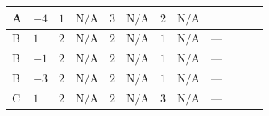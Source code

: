 \documentclass[8pt]{article}
\begin{document}
\begin{landscape}
\begin{longtable}{@{}llcccccc >{\raggedright\arraybackslash}p{0.21\linewidth} >{\raggedright\arraybackslash}p{0.21\linewidth} >{\raggedright\arraybackslash}p{0.21\linewidth}@{}}
\midrule
A & $-4$ & $1$ & $\text{N/A}$ & $3$ & $\text{N/A}$ & $2$ & $\text{N/A}$ & \scriptsize\adjustbox{max width=\linewidth}{$\begin{gathered} -\frac{33 {g_1}^2 {\lambda_5}}{2}\end{gathered}$} & \scriptsize\adjustbox{max width=\linewidth}{$\begin{gathered} +2 {\lambda_{12}^{(1)}} {\lambda_5}\end{gathered}$} & \scriptsize\adjustbox{max width=\linewidth}{$\begin{gathered} +2 {\lambda_1} {\lambda_5}\end{gathered}$} \\
\midrule
B & $1$ & $2$ & $\text{N/A}$ & $2$ & $\text{N/A}$ & $1$ & $\text{N/A}$ & --- & \scriptsize\adjustbox{max width=\linewidth}{$\begin{gathered} +2 {\lambda_{12}^{(1)}} {\lambda_5}\end{gathered}$} & \scriptsize\adjustbox{max width=\linewidth}{$\begin{gathered} +2 {\lambda_1} {\lambda_5}\end{gathered}$} \\
\midrule
B & $-1$ & $2$ & $\text{N/A}$ & $2$ & $\text{N/A}$ & $1$ & $\text{N/A}$ & --- & \scriptsize\adjustbox{max width=\linewidth}{$\begin{gathered} +2 {\lambda_{12}^{(1)}} {\lambda_5}\end{gathered}$} & \scriptsize\adjustbox{max width=\linewidth}{$\begin{gathered} +2 {\lambda_1} {\lambda_5}\end{gathered}$} \\
\midrule
B & $-3$ & $2$ & $\text{N/A}$ & $2$ & $\text{N/A}$ & $1$ & $\text{N/A}$ & --- & \scriptsize\adjustbox{max width=\linewidth}{$\begin{gathered} +2 {\lambda_{12}^{(1)}} {\lambda_5}\end{gathered}$} & \scriptsize\adjustbox{max width=\linewidth}{$\begin{gathered} +2 {\lambda_1} {\lambda_5}\end{gathered}$} \\
\midrule
C & $1$ & $2$ & $\text{N/A}$ & $2$ & $\text{N/A}$ & $3$ & $\text{N/A}$ & --- & \scriptsize\adjustbox{max width=\linewidth}{$\begin{gathered} +2 {\lambda_{12}^{(1)}} {\lambda_5}\end{gathered}$} & \scriptsize\adjustbox{max width=\linewidth}{$\begin{gathered} +2 {\lambda_1} {\lambda_5}\end{gathered}$} \\

\end{longtable}
\end{landscape}
\end{document}
